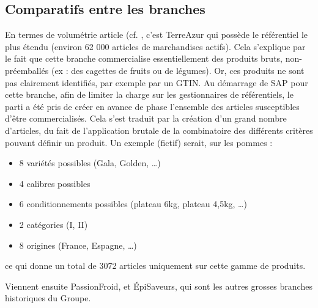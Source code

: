             \subsection{Comparatifs entre les branches}

                En termes de volumétrie article (cf. , c'est TerreAzur qui possède le référentiel le plus étendu (environ 62 000 articles de marchandises actifs).
                Cela s'explique par le fait que cette branche commercialise essentiellement des produits bruts, non-préemballés (ex : des cagettes de fruits ou de légumes).
                Or, ces produits ne sont pas clairement identifiés, par exemple par un GTIN.
                Au démarrage de SAP pour cette branche, afin de limiter la charge sur les gestionnaires de référentiels, le parti a été pris de créer en avance de phase l'ensemble des articles susceptibles d'être commercialisés.
                Cela s'est traduit par la création d'un grand nombre d'articles, du fait de l'application \og brutale \fg de la combinatoire des différents critères pouvant définir un produit.
                Un exemple (fictif) serait, sur les pommes : 
                \begin{itemize}
                    \item 8 variétés possibles (Gala, Golden, \dots)
                    \item 4 calibres possibles
                    \item 6 conditionnements possibles (plateau 6kg, plateau 4,5kg, \dots)
                    \item 2 catégories (I, II)
                    \item 8 origines (France, Espagne, \dots)
                \end{itemize}
                ce qui donne un total de 3072 articles uniquement sur cette gamme de produits.

                Viennent ensuite PassionFroid, et \'{E}piSaveurs, qui sont les autres \og grosses \fg branches historiques du Groupe.

